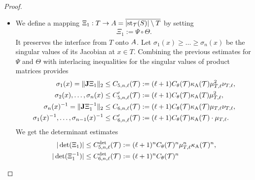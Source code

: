 \documentclass[10pt,a4paper]{article}
\begin{document}
\begin{proof}
\begin{itemize}
        
        \item 
        We define a mapping $ \Xi_{1} : T \rightarrow A = \overline{ \left|  \operatorname{st}_{{\mathcal T}}(S)  \right| \setminus T}$ by setting 
        \begin{align*}
            \Xi_{1} := \Psi \circ \Theta.
        \end{align*}
        It preserves the interface from $T$ onto $A$. 
        Let $\sigma_1(x) \geq \dots \geq \sigma_n(x)$ be the singular values of its Jacobian at $x \in T$. 
        Combining the previous estimates for $\Psi$ and $\Theta$ with interlacing inequalities for the singular values of product matrices provides 
        \begin{align*}
            \sigma_1(x) = \|  {\mathbf{J}} \Xi_{1}  \|_{2}
            &\leq 
            C_{5,n,\ell}({\mathcal T})
            :=
            (\ell+1) 
            C_\theta({\mathcal T})
            \kappa_{\rm A}({\mathcal T})
            \mu_{T,\ell}^{2}
            \nu_{T,\ell}           
            ,
            \\
            \sigma_2(x), \dots, \sigma_n(x) 
            &\leq 
            C'_{5,n,\ell}({\mathcal T})
            :=
            (\ell+1)
            C_\theta({\mathcal T})
            \kappa_{\rm A}(T) \mu_{T,\ell}^{2}
            ,
            \\
            \sigma_n(x)^{-1} = \|  {\mathbf{J}} \Xi_{1}^{-1}  \|_{2}
            &\leq
            C_{6,n,\ell}({\mathcal T})
            :=
            (\ell+1) 
            C_\theta({\mathcal T})
            \kappa_{\rm A}({\mathcal T})
            \mu_{T,\ell}
            \nu_{T,\ell}
            ,
            \\
            \sigma_1(x)^{-1}, \dots, \sigma_{n-1}(x)^{-1}
            &\leq 
            C'_{6,n,\ell}({\mathcal T})
            :=
            (\ell+1)
            C_\theta({\mathcal T})
            \kappa_{\rm A}({\mathcal T}) 
            \cdot 
            \mu_{T,\ell}
            .
        \end{align*}
        We get the determinant estimates
        \begin{align*}
            |\det(\Xi_{1})|
            &\leq 
            \Cdetfive{n}{\ell}(\calT)
            :=
            (\ell+1)^{n}
            \diameterratio(\calT)^{n}
            \mu_{T,\ell}^{n}
            \aspectratio(\calT)^{n}
            ,
            \\
            |\det(\Xi_{1}^{-1})|
            &\leq 
            \Cdetsechs{n}{\ell}(\calT)
            :=
            (\ell+1)^{n}
            \diameterratio(\calT)^{n}

\end{align*}
\end{itemize}
\end{proof}
\end{document}
